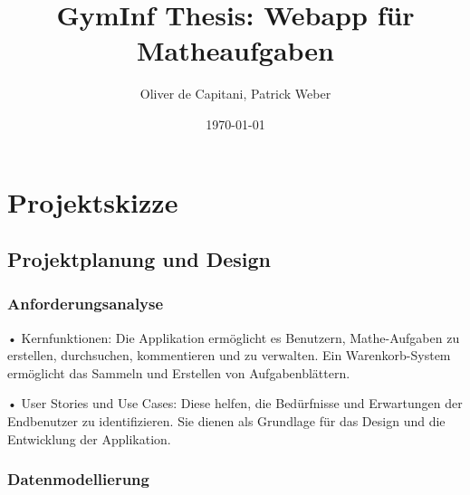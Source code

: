 \documentclass[12pt,a4paper]{article} %
\title{GymInf Thesis: Webapp für Matheaufgaben}
\date{\today}
\author{Oliver de Capitani, Patrick Weber}
\begin{document}
\maketitle %
% 











\newpage %
\tableofcontents %











\newpage


\section{Projektskizze}
\subsection{Projektplanung und Design}
\subsubsection*{Anforderungsanalyse}

•	Kernfunktionen: Die Applikation ermöglicht es Benutzern, Mathe-Aufgaben zu erstellen, durchsuchen, kommentieren und zu verwalten. Ein Warenkorb-System ermöglicht das Sammeln und Erstellen von Aufgabenblättern.

•	User Stories und Use Cases: Diese helfen, die Bedürfnisse und Erwartungen der Endbenutzer zu identifizieren. Sie dienen als Grundlage für das Design und die Entwicklung der Applikation.


\subsubsection*{Datenmodellierung}
\end{document}
